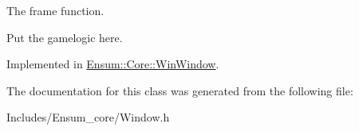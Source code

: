 The frame function. 

Put the gamelogic here. 

Implemented in \hyperlink{class_ensum_1_1_core_1_1_win_window_a3e828ccbc90f0d6ed81c2320277561e6}{Ensum\+::\+Core\+::\+Win\+Window}.



The documentation for this class was generated from the following file\+:\begin{DoxyCompactItemize}
\item 
Includes/\+Ensum\+\_\+core/Window.\+h\end{DoxyCompactItemize}
